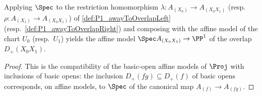 \begin{lemma}
  \label{lem:P1_SpecMap_overlap_chartIota}
  \leanok
  Applying \(\Spec\) to the restriction homomorphism \(\lambda : A_{(X_0)} \to
  A_{(X_0X_1)}\) (resp.\ \(\rho : A_{(X_1)} \to A_{(X_0X_1)}\)) of
  \ref{def:P1_awayToOverlapLeft} (resp.\ \ref{def:P1_awayToOverlapRight}) and composing
  with the affine model of the chart \(U_0\) (resp.\ \(U_1\)) yields the affine model
  \(\Spec A_{(X_0X_1)} \to \PP^1\) of the overlap \(D_+(X_0X_1)\).
\end{lemma}
\begin{proof}
  \leanok
  This is the compatibility of the basic-open affine models of \(\Proj\) with inclusions
  of basic opens: the inclusion \(D_+(fg) \subseteq D_+(f)\) of basic opens corresponds,
  on affine models, to \(\Spec\) of the canonical map \(A_{(f)} \to A_{(fg)}\).
\end{proof}

